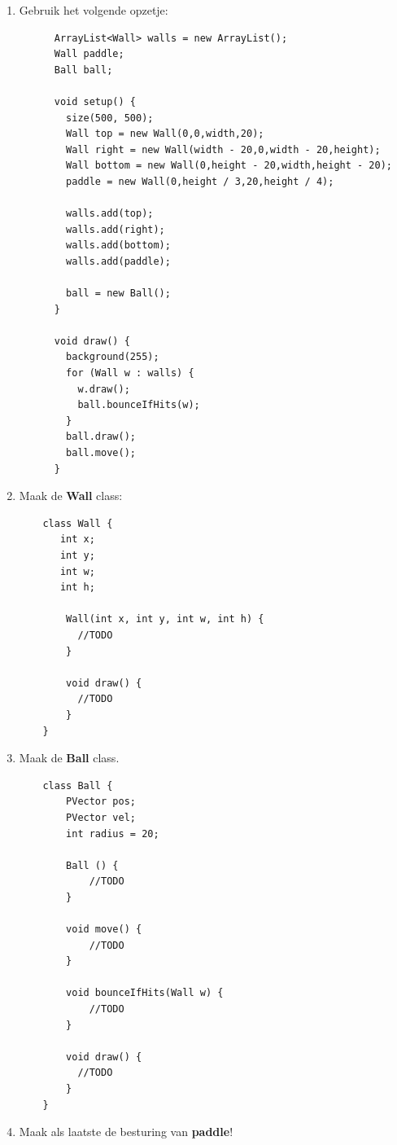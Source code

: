 \documentclass{../qh_assignment}
\begin{document}
\begin{enumerate}
    \item Gebruik het volgende opzetje:
    \begin{lstlisting}
      ArrayList<Wall> walls = new ArrayList();
      Wall paddle;
      Ball ball;
      
      void setup() {
        size(500, 500);
        Wall top = new Wall(0,0,width,20);
        Wall right = new Wall(width - 20,0,width - 20,height);
        Wall bottom = new Wall(0,height - 20,width,height - 20);
        paddle = new Wall(0,height / 3,20,height / 4);
        
        walls.add(top);
        walls.add(right);
        walls.add(bottom);
        walls.add(paddle);
       
        ball = new Ball();
      }
      
      void draw() {
        background(255);
        for (Wall w : walls) {
          w.draw();
          ball.bounceIfHits(w);
        }
        ball.draw();
        ball.move();
      }
    \end{lstlisting}
    
    \item Maak de \textbf{Wall} class:
    \begin{lstlisting}
    class Wall {
       int x;
       int y;
       int w;
       int h;
       
        Wall(int x, int y, int w, int h) {
          //TODO
        }
        
        void draw() {
          //TODO
        }
    }  
    \end{lstlisting}
    \item Maak de \textbf{Ball} class.
    \begin{lstlisting}
    class Ball {
        PVector pos;
        PVector vel; 
        int radius = 20;
        
        Ball () {
            //TODO
        }
        
        void move() {
            //TODO
        }
        
        void bounceIfHits(Wall w) {
            //TODO
        }
        
        void draw() {
          //TODO
        }
    }
    \end{lstlisting}
    \item Maak als laatste de besturing van \textbf{paddle}!
\end{enumerate}
\end{document}
